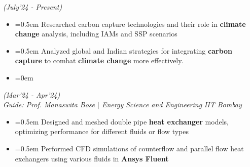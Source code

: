 \documentclass{article}
\begin{document}
  \hfill{\sl \small (July'24 - Present)}
\vspace{-7pt}
\begin{itemize}[label=\textcolor{myblue}{\textbullet},itemsep = -1.25mm, leftmargin=5.5mm]
\item{}\font=0.5em Researched carbon capture technologies and their role in \textbf{climate change} analysis, including IAMs and SSP scenarios
\item{}\font=0.5em Analyzed global and Indian strategies for integrating \textbf{carbon capture} to combat \textbf{climate change} more effectively.
\item{}\font=0em 
\end{itemize}
\vspace{-5pt}

  \hfill{\sl \small (Mar’24 - Apr’24)}\\
{\it Guide: Prof. Manaswita Bose $|$ Energy Science and Engineering} \hfill{\it IIT Bombay}\hspace{-2pt}
\vspace{-7pt}
\begin{itemize}[label=\textcolor{myblue}{\textbullet},itemsep = -1.25mm, leftmargin=5.5mm]
\item{}\font=0.5em Designed and meshed double pipe \textbf{heat exchanger} models, optimizing performance for different fluids or flow types
\item{}\font=0.5em Performed CFD simulations of counterflow and parallel flow heat exchangers using various fluids in \textbf{Ansys Fluent}
\end{itemize}

\vspace{-5pt}
\end{document}
